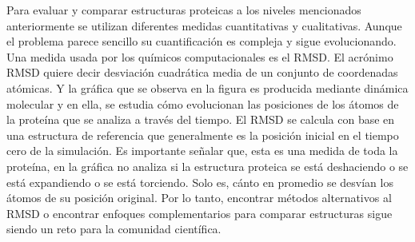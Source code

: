 Para evaluar y comparar estructuras proteicas a los niveles mencionados anteriormente se utilizan
diferentes medidas cuantitativas y cualitativas. Aunque el problema parece sencillo su cuantiﬁcaci\'{o}n es
compleja y sigue evolucionando. Una medida usada por los qu\'{i}micos computacionales es el RMSD. El acrónimo RMSD quiere decir desviación
cuadrática media de un conjunto de coordenadas atómicas. Y la gr\'{a}ﬁca que se observa en la figura 
es producida mediante dinámica molecular y en ella, se estudia cómo evolucionan las posiciones de los
átomos de la proteína que se analiza a través del tiempo. El RMSD se calcula con base en una estructura
de referencia que generalmente es la posición inicial en el tiempo cero de la simulación.
Es importante señalar que, esta es una medida de toda la proteína, en la gr\'{a}ﬁca no analiza si la estructura
proteica se está deshaciendo o se est\'{a} expandiendo o se está torciendo. Solo es, c\'{a}nto en promedio se desvían los \'{a}tomos de su posición original. Por lo tanto, encontrar
m\'{e}todos alternativos al RMSD o encontrar enfoques complementarios para comparar estructuras
sigue siendo un reto para la comunidad cient\'{i}ﬁca.
